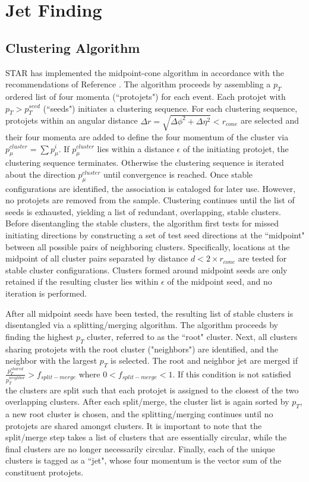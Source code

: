 \section{Jet Finding}

\subsection{Clustering Algorithm}

STAR has implemented the midpoint-cone algorithm in accordance with the recommendations of Reference \cite{Blazey:2000qt}.  The algorithm proceeds by assembling a $p_{T}$ ordered list of four momenta (``protojets") for each event.  Each protojet with $p_T>p_{T}^{seed}$ (``seeds") initiates a clustering sequence.  For each clustering sequence, protojets within an angular distance $\Delta r = \sqrt{\Delta\phi^{2} + \Delta\eta ^{2}} < r_{cone}$ are selected and their four momenta are added to define the four momentum of the cluster via $p_{\mu}^{cluster} = \sum p_{\mu}^{i}$.  If $p_{\mu}^{cluster}$ lies within a distance $\epsilon$ of the initiating protojet, the clustering sequence terminates.  Otherwise the clustering sequence is iterated about the direction $p_{\mu}^{cluster}$ until convergence is reached.  Once stable configurations are identified, the association is cataloged for later use.  However, no protojets are removed from the sample.  Clustering continues until the list of seeds is exhausted, yielding a list of redundant, overlapping, stable clusters.  Before disentangling the stable clusters, the algorithm first tests for missed initiating directions by constructing a set of test seed directions at the ``midpoint" between all possible pairs of neighboring clusters.  Specifically, locations at the midpoint of all cluster pairs separated by distance $d < 2 \times r_{cone}$ are tested for stable cluster configurations.  Clusters formed around midpoint seeds are only retained if the resulting cluster lies within $\epsilon$ of the midpoint seed, and no iteration is performed.  

After all midpoint seeds have been tested, the resulting list of stable clusters is disentangled via a splitting/merging algorithm.  The algorithm proceeds by  finding the highest $p_{T}$ cluster, referred to as the ``root" cluster.  Next, all clusters sharing protojets with the root cluster ("neighbors") are identified, and the neighbor with the largest $p_T$ is selected.  The root and neighbor jet are merged if $\frac{p_{T}^{shared}}{p_{T}^{neighbor}}>f_{split-merge}$ where $0 < f_{split-merge} < 1$.  If this condition is not satisfied the clusters are split such that each protojet is assigned to the closest of the two overlapping clusters.  After each split/merge, the cluster list is again sorted by $p_T$, a new root cluster is chosen, and the splitting/merging continues until no protojets are shared amongst clusters.  It is important to note that the split/merge step takes a  list of clusters that are essentially circular, while the final clusters are no longer necessarily circular.   Finally, each of the unique clusters is tagged as a ``jet", whose four momentum is the vector sum of the constituent protojets.

